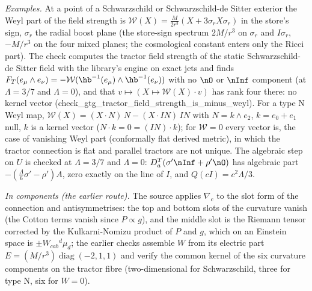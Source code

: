 \emph{Examples.} At a point of a Schwarzschild or Schwarzschild-de Sitter exterior the Weyl part of the field strength is $\mathcal{W}(X) = \tfrac{M}{2r^{3}}(X + 3\sigma_{r}X\sigma_{r})$ in the store's sign, $\sigma_{r}$ the radial boost plane (the store-sign spectrum $2M/r^{3}$ on $\sigma_{r}$ and $I\sigma_{r}$, $-M/r^{3}$ on the four mixed planes; the cosmological constant enters only the Ricci part). The check computes the tractor field strength of the static Schwarzschild-de Sitter field with the library's engine on exact jets and finds $F_{T}(e_{\mu}\wedge e_{\nu}) = -\mathcal{W}(\hb^{-1}(e_{\mu})\wedge\hb^{-1}(e_{\nu}))$ with no $\nO$ or $\nInf$ component (at $\Lambda = 3/7$ and $\Lambda = 0$), and that $v \mapsto (X \mapsto \mathcal{W}(X)\cdot v)$ has rank four there: no kernel vector (check\_gtg\_tractor\_field\_strength\_is\_minus\_weyl). For a type N Weyl map, $\mathcal{W}(X) = (X\cdot N)\,N - (X\cdot IN)\,IN$ with $N = k\wedge e_{2}$, $k = e_{0} + e_{1}$ null, $k$ is a kernel vector ($N\cdot k = 0 = (IN)\cdot k$); for $\mathcal{W} = 0$ every vector is, the case of vanishing Weyl part (conformally flat derived metric), in which the tractor connection is flat and parallel tractors are not unique. The algebraic step on $U$ is checked at $\Lambda = 3/7$ and $\Lambda = 0$: $D^{T}_{a}(\sigma'\nInf + \rho'\nO)$ has algebraic part $-(\tfrac{\Lambda}{6}\sigma' - \rho')A$, zero exactly on the line of $I$, and $Q(cI) = c^{2}\Lambda/3$.

\emph{In components (the earlier route).} The source applies $\nabla_{c}$ to the slot form of the connection and antisymmetrises: the top and bottom slots of the curvature vanish (the Cotton terms vanish since $P \propto g$), and the middle slot is the Riemann tensor corrected by the Kulkarni-Nomizu product of $P$ and $g$, which on an Einstein space is $\pm W_{cab}{}^{d}\mu_{d}$; the earlier checks assemble $W$ from its electric part $E = (M/r^{3})\operatorname{diag}(-2,1,1)$ and verify the common kernel of the six curvature components on the tractor fibre (two-dimensional for Schwarzschild, three for type N, six for $W = 0$).
